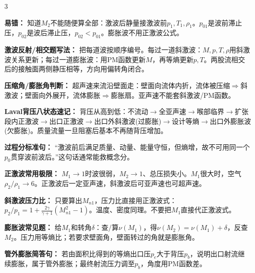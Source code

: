 \documentclass[a4paper]{article}
\newcommand{\sect}[1]{\par{\bfseries\color{Q}#1：}}
\begin{document}
\begin{multicols}{3}
{\sect{易错}
知道$M_2$不能随便算全部：激波后静量接激波前$p_1,T_1,\rho_1$。$p_{01}$是波前滞止压，$p_{02}$是波后滞止压，$p_{02}<p_{01}$。膨胀波不用正激波公式。
\sect{激波反射/相交题写法}
把每道波按顺序编号。每过一道斜激波：$M,p,T,\rho$用斜激波关系更新；每过一道膨胀波：用PM函数更新$M$，再等熵更新$p,T$。两股流相交后的接触面两侧静压相等，方向用偏转角闭合。
\sect{压缩角/膨胀角判断}
超声速来流沿壁面走：壁面向流体内折，流体被压缩$\Rightarrow$斜激波；壁面向外展开，流体膨胀$\Rightarrow$膨胀扇。亚声速不能套斜激波/PM函数。
\sect{Laval背压八状态速记}
背压从高到低：不流动$\to$全亚声速$\to$喉部临界$\to$扩张段内正激波$\to$出口正激波$\to$出口外斜激波(过膨胀)$\to$设计等熵$\to$出口外膨胀波(欠膨胀)。质量流量一旦阻塞后基本不再随背压增加。
\sect{过程分标准句}
“激波前后满足质量、动量、能量守恒，但熵增，故不可用同一个$p_0$贯穿波前波后。”这句话通常能救概念分。
\sect{正激波常用极限}
$M_1\to1$时波很弱，$M_2\to1$、总压损失小。$M_1$很大时，空气$\rho_2/\rho_1\to6$。正激波后一定亚声速，斜激波后可亚声速也可超声速。
\sect{斜激波压力比}
只要算出$M_{n1}$，压力比直接用正激波式：$p_2/p_1=1+\frac{2\gamma}{\gamma+1}(M_{n1}^2-1)$。温度、密度同理。不要把$M_1$直接代正激波式。
\sect{膨胀波常见题}
给$M_1$和转角$\delta$：查/算$\nu(M_1)$，得$\nu(M_2)=\nu(M_1)+\delta$，反查$M_2$。压力用等熵比；若要求壁面角，壁面转过的角就是膨胀角。
\sect{管外膨胀简答句}
若由面积比得到的等熵出口压$p_e$大于背压$p_b$，说明出口射流继续膨胀，属于管外膨胀；最终射流压力调至$p_b$，角度用PM函数差。
}


\end{multicols}
\end{document}
